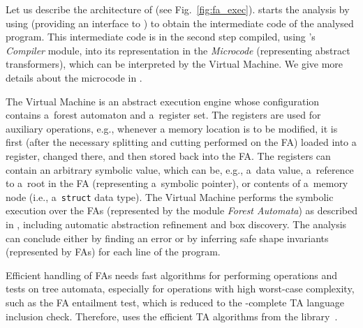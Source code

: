 {Let us describe the architecture of \forester (see Fig.~\ref{fig:fa_exec}).
\forester starts the analysis by using \codelistener (providing an interface to
\gcc) to obtain the intermediate code of the analysed program.
This intermediate code is in the second step compiled, using \forester's
\emph{Compiler} module, into its representation in the \forester
\emph{Microcode} (representing abstract transformers), which can be interpreted
by the Virtual Machine.
We give more details about the microcode in .

The Virtual Machine is an abstract execution engine whose configuration contains
a~forest automaton and a~register set.
The registers are used for auxiliary operations, e.g., whenever a memory
location is to be modified, it is first (after the necessary splitting and
cutting performed on the FA) loaded into a register, changed there, and then
stored back into the FA.
The registers can contain an arbitrary symbolic value, which can be, e.g.,
a~data value, a~reference to a~root in the FA (representing a~symbolic pointer),
or contents of a~memory node (i.e., a~\texttt{struct} data type).
The Virtual Machine performs the symbolic execution over the FAs (represented by
the module \emph{Forest Automata}) as described in ,
including automatic abstraction refinement and box discovery.
The analysis can conclude either by finding an error or by inferring
safe shape invariants (represented by FAs) for each line of the program.

Efficient handling of FAs needs fast algorithms for performing operations and
tests on tree automata, especially for operations with high worst-case
complexity, such as the FA entailment test, which is reduced to the
\exptime-complete TA language inclusion check.
Therefore, \forester uses the efficient TA algorithms from the \vata
library~\cite{libvata}.


}
